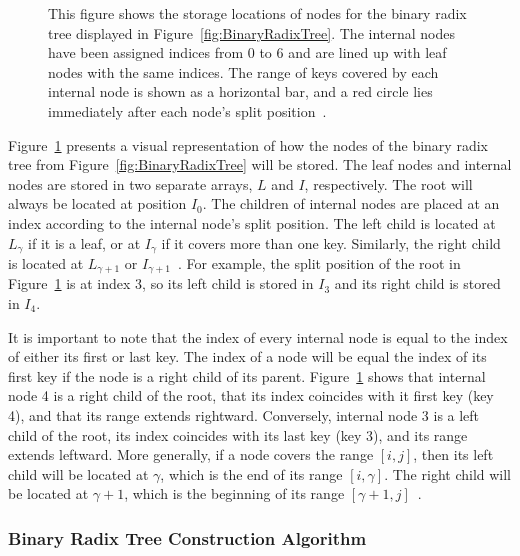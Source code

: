 \documentclass{sig-alternate}
\begin{document}
\begin{figure}
\centering
{}
\caption{This figure shows the storage locations of nodes for the binary radix tree displayed in Figure~\ref{fig:BinaryRadixTree}. The internal nodes have been assigned indices from 0 to 6 and are lined up with leaf nodes with the same indices. The range of keys covered by each internal node is shown as a horizontal bar, and a red circle lies immediately after each node's split position~\cite{Karras:2012}.}
\label{fig:BinaryRadixArrays}
\end{figure}

Figure~\ref{fig:BinaryRadixArrays} presents a visual representation of how the nodes of the binary radix tree from Figure~\ref{fig:BinaryRadixTree} will be stored. The leaf nodes and internal nodes are stored in two separate arrays, $L$ and $I$, respectively. The root will always be located at position $I_{0}$. The children of internal nodes are placed at an index according to the internal node's split position. The left child is located at $L_{\gamma}$ if it is a leaf, or at $I_{\gamma}$ if it covers more than one key. Similarly, the right child is located at $L_{\gamma+1}$ or $I_{\gamma+1}$~\cite{Karras:2012}. For example, the split position of the root in Figure~\ref{fig:BinaryRadixArrays} is at index 3, so its left child is stored in $I_{3}$ and its right child is stored in $I_{4}$.

It is important to note that the index of every internal node is equal to the index of either its first or last key. The index of a node will be equal the index of its first key if the node is a right child of its parent. Figure~\ref{fig:BinaryRadixArrays} shows that internal node 4 is a right child of the root, that its index coincides with it first key (key 4), and that its range extends rightward. Conversely, internal node 3 is a left child of the root, its index coincides with its last key (key 3), and its range extends leftward. More generally, if a node covers the range $[i,j]$, then its left child will be located at $\gamma$, which is the end of its range $[i,\gamma]$. The right child will be located at $\gamma+1$, which is the beginning of its range $[\gamma+1,j]$~\cite{Karras:2012}.

\subsubsection{Binary Radix Tree Construction Algorithm}
\label{sec:algorithm}
\end{document}
